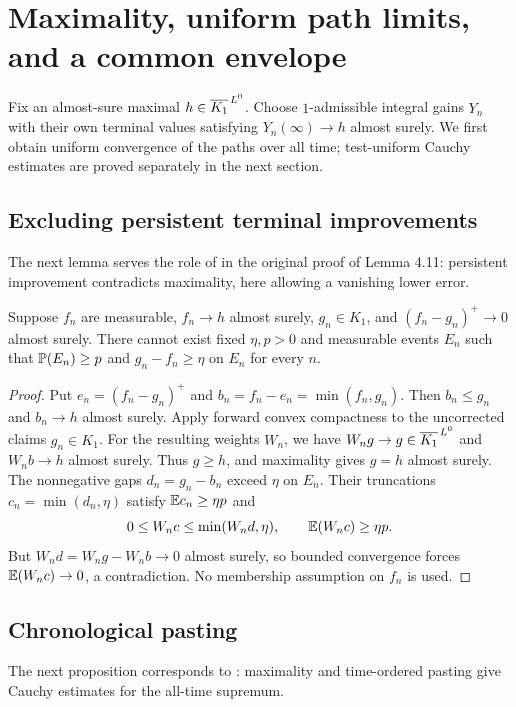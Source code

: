 \section{Maximality, uniform path limits, and a common envelope}\label{sec:selection}
Fix an almost-sure maximal $h\in\overline{K_1}^{\,L^0}$. Choose $1$-admissible integral
gains $Y_n$ with their own terminal values satisfying $Y_n(\infty)\to h$
almost surely. We first obtain uniform convergence of the paths over all time;
test-uniform Cauchy estimates are proved separately in the next section.

\subsection{Excluding persistent terminal improvements}
The next lemma serves the role of \cite[Lemma A3.1]{DS} in the original proof of Lemma 4.11: persistent improvement contradicts maximality, here allowing a vanishing lower error.

\begin{lemma}\label{lem:persistent-improvement}
Suppose $f_n$ are measurable, $f_n\to h$ almost surely, $g_n\in K_1$, and
$(f_n-g_n)^+\to0$ almost surely. There cannot exist fixed $\eta,p>0$ and
measurable events $E_n$ such that $\mathbb P(E_n)\geq p$ and $g_n-f_n\geq\eta$
on $E_n$ for every $n$.
\end{lemma}
\begin{proof}
Put $e_n=(f_n-g_n)^+$ and $b_n=f_n-e_n=\min(f_n,g_n)$.
Then $b_n\leq g_n$ and $b_n\to h$ almost surely. Apply forward convex
compactness to the uncorrected claims $g_n\in K_1$. For the resulting weights
$W_n$, we have $W_ng\to g\in\overline{K_1}^{\,L^0}$ and $W_nb\to h$ almost surely.
Thus $g\geq h$, and maximality gives $g=h$ almost surely.
The nonnegative gaps $d_n=g_n-b_n$ exceed $\eta$ on $E_n$.
Their truncations $c_n=\min(d_n,\eta)$ satisfy $\mathbb E c_n\geq\eta p$ and
\[
 0\leq W_nc\leq\min(W_nd,\eta),\qquad \mathbb E(W_nc)\geq\eta p.
\]
But $W_nd=W_ng-W_nb\to0$ almost surely, so bounded convergence forces
$\mathbb E(W_nc)\to0$, a contradiction. No membership assumption on $f_n$ is used.
\end{proof}

\subsection{Chronological pasting}
The next proposition corresponds to \cite[Lemma 4.5]{DS}: maximality and time-ordered pasting give Cauchy estimates for the all-time supremum.

